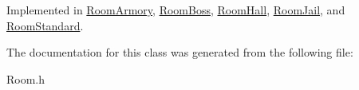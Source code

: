 Implemented in \hyperlink{classRoomArmory_af4199a79cd8e191eb01feb93b19e5a4e}{RoomArmory}, \hyperlink{classRoomBoss_acd5c1cfde60b2865189c40839d5625f0}{RoomBoss}, \hyperlink{classRoomHall_a8be624a3f3ae8c4408ac07f190fe8be0}{RoomHall}, \hyperlink{classRoomJail_a4f33dd7e286e3505b622d97b30616d28}{RoomJail}, and \hyperlink{classRoomStandard_af1f9146a7d38e33b3f546f41ea632e9b}{RoomStandard}.

The documentation for this class was generated from the following file:\begin{DoxyCompactItemize}
\item 
Room.h\end{DoxyCompactItemize}
